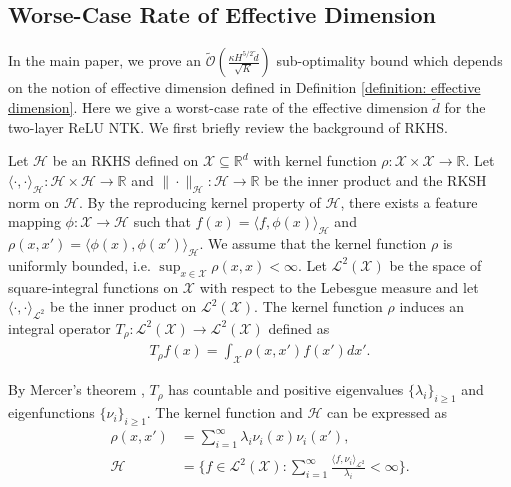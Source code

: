 \documentclass{article} \usepackage{iclr2023/iclr2023_conference,times}
\begin{document}
\color{black}




\subsection{Worse-Case Rate of Effective Dimension}
In the main paper, we prove an $\tilde{\mathcal{O}}\left(  \frac{ \kappa H^{5/2}  \tilde{d} }{\sqrt{K}} \right)$ sub-optimality bound which depends on the notion of effective dimension defined in Definition \ref{definition: effective dimension}. Here we give a worst-case rate of the effective dimension $\tilde{d}$ for the two-layer ReLU NTK. We first briefly review the background of RKHS. 


Let $\mathcal{H}$ be an RKHS defined on $\mathcal{X} \subseteq \mathbb{R}^d$ with kernel function $\rho: \mathcal{X} \times \mathcal{X} \rightarrow \mathbb{R}$. Let $\langle \cdot, \cdot \rangle_{\mathcal{H}}: \mathcal{H} \times \mathcal{H} \rightarrow \mathbb{R}$ and $\| \cdot \|_{\mathcal{H}}: \mathcal{H} \rightarrow \mathbb{R}$ be the inner product and the RKSH norm on $\mathcal{H}$. By the reproducing kernel property of $\mathcal{H}$, there exists a feature mapping $\phi: \mathcal{X} \rightarrow \mathcal{H}$ such that $f(x) = \langle f, \phi(x) \rangle_{\mathcal{H}}$ and $\rho(x,x') = \langle \phi(x), \phi(x') \rangle_{\mathcal{H}}$. We assume that the kernel function $\rho$ is uniformly bounded, i.e. $\sup_{x \in \mathcal{X}} \rho(x,x) < \infty$. Let $\mathcal{L}^2(\mathcal{X})$ be the space of square-integral functions on $\mathcal{X}$ with respect to the Lebesgue measure and let $\langle \cdot, \cdot \rangle_{\mathcal{L}^2}$ be the inner product on $\mathcal{L}^2(\mathcal{X})$. The kernel function $\rho$ induces an integral operator $T_{\rho}:\mathcal{L}^2(\mathcal{X}) \rightarrow \mathcal{L}^2(\mathcal{X}) $ defined as 
\begin{align*}
    T_{\rho} f(x) = \int_{\mathcal{X}} \rho(x,x') f(x') dx'. 
\end{align*}

By Mercer's theorem \citep{steinwart2008support}, $T_{\rho}$ has countable and positive eigenvalues $\{\lambda_i\}_{i \geq 1}$ and eigenfunctions $\{\nu_i\}_{i \geq 1}$. The kernel function and $\mathcal{H}$ can be expressed as 
\begin{align*}
    \rho(x,x') &= \sum_{i=1}^{\infty} \lambda_i \nu_i(x) \nu_i(x'), \\ 
    \mathcal{H} &= \{f \in \mathcal{L}^2(\mathcal{X}): \sum_{i=1}^{\infty} \frac{\langle f, \nu_i \rangle_{\mathcal{L}^2}}{ \lambda_i} < \infty\}. 
\end{align*}
\end{document}
